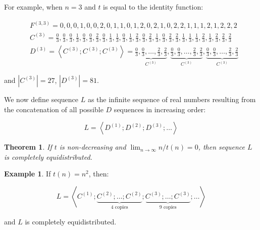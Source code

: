 \documentclass[11pt,a4paper]{tesis}
\theoremstyle{plain}
\newtheorem{theorem}{Theorem}
\theoremstyle{definition}
\newtheorem*{exmp*}{Example}
\begin{document}
For example, when $n = 3$ and $t$ is equal to the identity function:

\begin{equation*}
  \begin{aligned}
    & F^{(3, 3)} = 0, 0, 0, 1, 0, 0, 2, 0, 1, 1, 0, 1, 2, 0, 2, 1, 0, 2, 2, 1, 1, 1, 2, 1, 2, 2, 2 \\
    & C^{(3)} = \frac{0}{3}, \frac{0}{3}, \frac{0}{3}, \frac{1}{3}, \frac{0}{3}, \frac{0}{3}, \frac{2}{3}, \frac{0}{3}, \frac{1}{3}, \frac{1}{3}, \frac{0}{3}, \frac{1}{3}, \frac{2}{3}, \frac{0}{3}, \frac{2}{3}, \frac{1}{3}, \frac{0}{3}, \frac{2}{3}, \frac{2}{3}, \frac{1}{3}, \frac{1}{3}, \frac{1}{3}, \frac{2}{3}, \frac{1}{3}, \frac{2}{3}, \frac{2}{3}, \frac{2}{3} \\
    & D^{(3)} = \left< C^{(3)} ; C^{(3)} ; C^{(3)} \right> = \underbrace{\frac{0}{3}, \frac{0}{3}, \dots, \frac{2}{3}, \frac{2}{3}}_{C^{(3)}}, \underbrace{\frac{0}{3}, \frac{0}{3}, \dots, \frac{2}{3}, \frac{2}{3}}_{C^{(3)}}, \underbrace{\frac{0}{3}, \frac{0}{3}, \dots, \frac{2}{3}, \frac{2}{3}}_{C^{(3)}}
  \end{aligned}
\end{equation*}

and $|C^{(3)}| = 27$, $|D^{(3)}| = 81$.

We now define sequence $L$ as the infinite sequence of real numbers resulting from the concatenation of all possible $D$ sequences in increasing order:

\begin{equation*}
  L = \left< D^{(1)} ; D^{(2)} ;  D^{(3)} ; \dots \right>
\end{equation*}

\begin{theorem}\label{theorem:l-is-completely-equidistributed}
  If $t$ is non-decreasing and $\lim_{n \to \infty} n / t(n) = 0$, then sequence $L$ is completely equidistributed.
\end{theorem}

\begin{exmp*}
  If $t(n) = n^2$, then:

  \begin{equation*}
    L = \left< C^{(1)} ; \underbrace{C^{(2)} ; \dots ;  C^{(2)}}_{4 \text{ copies}} ;  \underbrace{C^{(3)} ; \dots ;  C^{(3)}}_{9 \text{ copies}} ; \dots \right>
  \end{equation*}

  and $L$ is completely equidistributed.
\end{exmp*}
\end{document}
